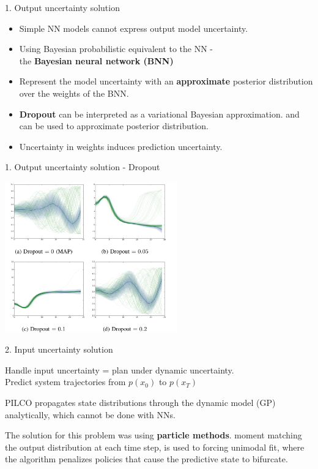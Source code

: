 \documentclass{beamer}
\begin{document}
\begin{frame}{1. Output uncertainty solution}
\begin{itemize}
    \item Simple NN models cannot express output model uncertainty.
    \item Using Bayesian probabilistic equivalent to the NN -\\ the \textbf{Bayesian neural network (BNN)}
    \item Represent the model uncertainty with an \textbf{approximate} posterior distribution over the weights of the BNN.
    \item \textbf{Dropout} can be interpreted as a variational Bayesian approximation. and can be used to approximate posterior distribution.
    \item Uncertainty in weights induces prediction uncertainty.
\end{itemize}
\end{frame}

\begin{frame}{1. Output uncertainty solution - Dropout}
    \begin{center}
        \includegraphics[height=6.5cm]{img/dropout.png}
    \end{center}
\end{frame}

\begin{frame}{2. Input uncertainty solution}
    \item Handle input uncertainty = plan under dynamic uncertainty.\\
          Predict system trajectories from $p(x_0)$ to $p(x_T)$
    \item PILCO propagates state distributions through the dynamic model (GP) analytically, which cannot be done with NNs.
    \item The solution for this problem was using \textbf{particle methods}.
    \items moment matching the output distribution at each time step, is used to forcing unimodal fit, where the algorithm penalizes policies that cause the predictive state to bifurcate.
\end{frame}
\end{document}
